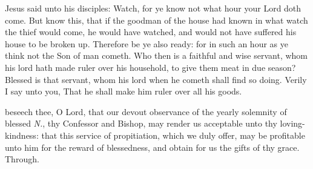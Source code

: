 \vspace{-1ex}


\vspace{-0.25\baselineskip}

\label{CommonConfessorBishopIIGospel}

\vspace{-0.1\baselineskip}

 Jesus said unto his disciples: Watch, for ye know not what hour your Lord doth come. But know this, that if the goodman of the house had known in what watch the thief would come, he would have watched, and would not have suffered his house to be broken up. Therefore be ye also ready: for in such an hour as ye think not the Son of man cometh. Who then is a faithful and wise servant, whom his lord hath made ruler over his household, to give them meat in due season? Blessed is that servant, whom his lord when he cometh shall find so doing. Verily I say unto you, That he shall make him ruler over all his goods.


\vspace{-0.25\baselineskip}

\secret\label{CommonConfessorBishopIISecret}

\vspace{-0.1\baselineskip}

 beseech thee, O Lord, that our devout observance of the yearly solemnity of blessed \textit{N.}, thy Confessor and Bishop, may render us acceptable unto thy loving-kindness: that this service of propitiation, which we duly offer, may be profitable unto him for the reward of blessedness, and obtain for us the gifts of thy grace. Through.


\vspace{-0.25\baselineskip}

